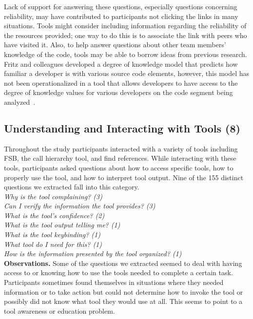 \documentclass[conference]{IEEEtran}
\begin{document}
Lack of support for answering these questions, especially questions concerning reliability, may have contributed to participants not clicking the links in many situations.  
Tools might consider including information regarding the reliability of the resources provided; one way to do this is to associate the link with peers who have visited it.
Also, to help answer questions about other team members' knowledge of the code, tools may be able to borrow ideas from previous research.
Fritz and colleagues developed a degree of knowledge model that predicts how familiar a developer is with various source code elements, however, this model has not been operationalized in a tool that allows developers to have access to the degree of knowledge values for various developers on the code segment being analyzed~\cite{fritz2010degree}.




\noindent\subsection{\textbf{Understanding and Interacting with Tools (8)}}\label{uit}

Throughout the study participants interacted with a variety of tools including FSB, the call hierarchy tool, and find references. 
While interacting with these tools, participants asked questions about how to access specific tools, how to properly use the tool, and how to interpret tool output. 
Nine of the 155 distinct questions we extracted fall into this category.
\\

\noindent\emph{Why is the tool complaining? (3)} \\
\emph{Can I verify the information the tool provides? (3)} \\
\emph{What is the tool's confidence? (2)} \\
\emph{What is the tool output telling me? (1)} \\
\emph{What is the tool keybinding? (1)} \\
\emph{What tool do I need for this? (1)} \\
\emph{How is the information presented by the tool organized? (1)} \\


\noindent\textbf{Observations.}
Some of the questions we extracted seemed to deal with having access to or knowing how to use the tools needed to complete a certain task. 
Participants sometimes found themselves in situations where they needed information or to take action but could not determine how to invoke the tool or possibly did not know what tool they would use at all. 
This seems to point to a tool awareness or education problem.
\end{document}
